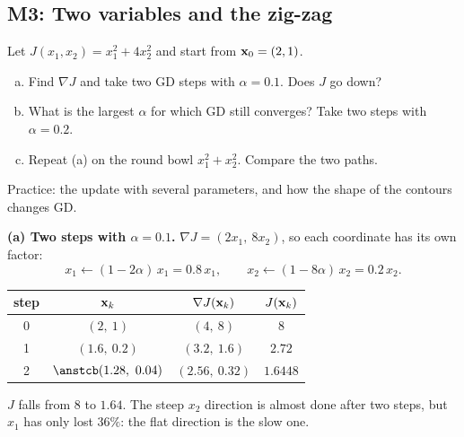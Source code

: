 \subsection{M3: Two variables and the zig-zag}

\begin{frame}{}
  \begin{probbox}
    Let $J(x_1, x_2) = x_1^2 + 4x_2^2$ and start from $\mathbf{x}_0 = (2, 1)$.
    \begin{enumerate}[(a)]
      \item Find $\nabla J$ and take two GD steps with $\alpha = 0.1$. Does $J$ go down?
      \item What is the largest $\alpha$ for which GD still converges? Take two steps with $\alpha = 0.2$.
      \item Repeat (a) on the round bowl $x_1^2 + x_2^2$. Compare the two paths.
    \end{enumerate}
  \end{probbox}
  \footnotesize\textcolor{mGrey}{Practice: the update with several parameters, and how the shape of the contours changes GD.}
\end{frame}

\begin{frame}{}
  \textbf{(a) Two steps with $\alpha = 0.1$.} $\nabla J = (2x_1,\ 8x_2)$, so each coordinate has its own factor:
  \[
    x_1 \leftarrow (1 - 2\alpha)\,x_1 = 0.8\,x_1, \qquad x_2 \leftarrow (1 - 8\alpha)\,x_2 = 0.2\,x_2 .
  \]
  \begin{center}\small
  \begin{tabular}{@{}c c c c@{}}
    \toprule
    step & $\mathbf{x}_k$ & $\nabla J(\mathbf{x}_k)$ & $J(\mathbf{x}_k)$ \\
    \midrule
    0 & $(2,\ 1)$ & $(4,\ 8)$ & $8$ \\
    1 & $(1.6,\ 0.2)$ & $(3.2,\ 1.6)$ & $2.72$ \\
    2 & $\ans{(1.28,\ 0.04)}$ & $(2.56,\ 0.32)$ & $1.6448$ \\
    \bottomrule
  \end{tabular}
  \end{center}
  $J$ falls from $8$ to $1.64$. The steep $x_2$ direction is almost done after two steps, but $x_1$ has only
  lost $36\%$: the flat direction is the slow one.
\end{frame}

